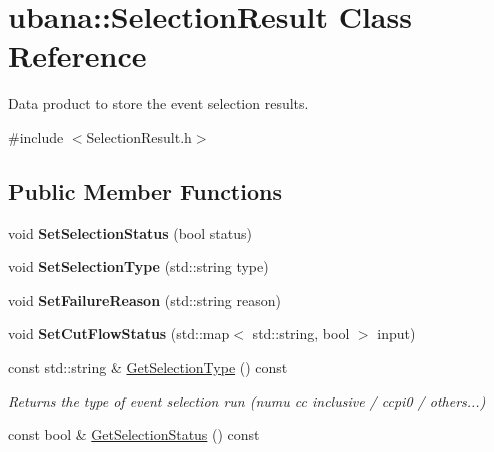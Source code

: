 \hypertarget{classubana_1_1SelectionResult}{\section{ubana\-:\-:Selection\-Result Class Reference}
\label{classubana_1_1SelectionResult}
}


Data product to store the event selection results.  




{\ttfamily \#include $<$Selection\-Result.\-h$>$}

\subsection*{Public Member Functions}
\begin{DoxyCompactItemize}
\item 
\hypertarget{classubana_1_1SelectionResult_a1e042345d4fad423d897c944afb4a2c2}{void {\bfseries Set\-Selection\-Status} (bool status)}\label{classubana_1_1SelectionResult_a1e042345d4fad423d897c944afb4a2c2}

\item 
\hypertarget{classubana_1_1SelectionResult_a44cacfd834cb799f18938de7134c0086}{void {\bfseries Set\-Selection\-Type} (std\-::string type)}\label{classubana_1_1SelectionResult_a44cacfd834cb799f18938de7134c0086}

\item 
\hypertarget{classubana_1_1SelectionResult_ab7053b38033e245ffa2c9ad3c6a4b3dc}{void {\bfseries Set\-Failure\-Reason} (std\-::string reason)}\label{classubana_1_1SelectionResult_ab7053b38033e245ffa2c9ad3c6a4b3dc}

\item 
\hypertarget{classubana_1_1SelectionResult_a7a18d47cf1572ff34b538e503d355f70}{void {\bfseries Set\-Cut\-Flow\-Status} (std\-::map$<$ std\-::string, bool $>$ input)}\label{classubana_1_1SelectionResult_a7a18d47cf1572ff34b538e503d355f70}

\item 
\hypertarget{classubana_1_1SelectionResult_afcfc5b9afaf6e549117ae49bb9adfd1a}{const std\-::string \& \hyperlink{classubana_1_1SelectionResult_afcfc5b9afaf6e549117ae49bb9adfd1a}{Get\-Selection\-Type} () const }\label{classubana_1_1SelectionResult_afcfc5b9afaf6e549117ae49bb9adfd1a}

\begin{DoxyCompactList}\small\item\em Returns the type of event selection run (numu cc inclusive / ccpi0 / others...) \end{DoxyCompactList}\item 
\hypertarget{classubana_1_1SelectionResult_a776daea1e79f4b6978f0d4fd17a0a845}{const bool \& \hyperlink{classubana_1_1SelectionResult_a776daea1e79f4b6978f0d4fd17a0a845}{Get\-Selection\-Status} () const }\label{classubana_1_1SelectionResult_a776daea1e79f4b6978f0d4fd17a0a845}


\end{DoxyCompactItemize}
